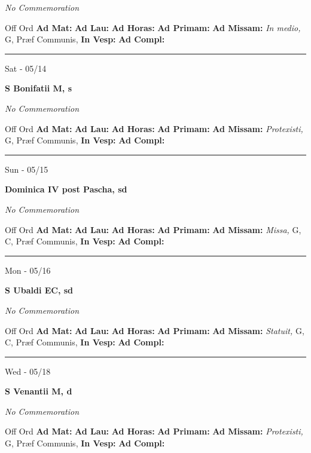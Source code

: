 \documentclass[letterpaper, 10pt]{article}
\begin{document}
\textit{No Commemoration}\begin{justify}
Off Ord
\textbf{Ad Mat: }
\textbf{Ad Lau: }
\textbf{Ad Horas: }
\textbf{Ad Primam: }
\textbf{Ad Missam:} \textit{In medio, } G, Præf Communis, 
\textbf{In Vesp: }
\textbf{Ad Compl: }\end{justify}



\hrule
\begin{center}
Sat - 05/14
\end{center}\textbf{ \large S Bonifatii M, \textnormal{\normalsize s}}

\textit{No Commemoration}\begin{justify}
Off Ord
\textbf{Ad Mat: }
\textbf{Ad Lau: }
\textbf{Ad Horas: }
\textbf{Ad Primam: }
\textbf{Ad Missam:} \textit{Protexisti, } G, Præf Communis, 
\textbf{In Vesp: }
\textbf{Ad Compl: }\end{justify}



\hrule
\begin{center}
Sun - 05/15
\end{center}\textbf{ \large Dominica IV post Pascha, \textnormal{\normalsize sd}}

\textit{No Commemoration}\begin{justify}
Off Ord
\textbf{Ad Mat: }
\textbf{Ad Lau: }
\textbf{Ad Horas: }
\textbf{Ad Primam: }
\textbf{Ad Missam:} \textit{Missa, } G, C, Præf Communis, 
\textbf{In Vesp: }
\textbf{Ad Compl: }\end{justify}



\hrule
\begin{center}
Mon - 05/16
\end{center}\textbf{ \large S Ubaldi EC, \textnormal{\normalsize sd}}

\textit{No Commemoration}\begin{justify}
Off Ord
\textbf{Ad Mat: }
\textbf{Ad Lau: }
\textbf{Ad Horas: }
\textbf{Ad Primam: }
\textbf{Ad Missam:} \textit{Statuit, } G, C, Præf Communis, 
\textbf{In Vesp: }
\textbf{Ad Compl: }\end{justify}



\hrule
\begin{center}
Wed - 05/18
\end{center}\textbf{ \large S Venantii M, \textnormal{\normalsize d}}

\textit{No Commemoration}\begin{justify}
Off Ord
\textbf{Ad Mat: }
\textbf{Ad Lau: }
\textbf{Ad Horas: }
\textbf{Ad Primam: }
\textbf{Ad Missam:} \textit{Protexisti, } G, Præf Communis, 
\textbf{In Vesp: }
\textbf{Ad Compl: }\end{justify}
\end{document}
